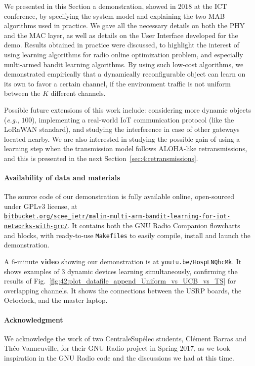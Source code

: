 We presented in this Section a demonstration, showed in $2018$ at the ICT conference,
by specifying the system model and explaining the two MAB algorithms used in practice.
We gave all the necessary details on both the PHY and the MAC layer, as well as details on the User Interface developed for the demo.
Results obtained in practice were discussed, to highlight the interest of using learning algorithms for radio online optimization problem, and especially multi-armed bandit learning algorithms.
%
By using such low-cost algorithms, we demonstrated empirically that a dynamically reconfigurable object can learn on its own to favor a certain channel, if the environment traffic is not uniform between the $K$ different channels.


Possible future extensions of this work include:
considering more dynamic objects (\emph{e.g.}, $100$),
implementing a real-world IoT communication protocol (like the LoRaWAN standard),
and studying the interference in case of other gateways located nearby.
%
We are also interested in studying the possible gain of using a learning step when the transmission model follows ALOHA-like retransmissions, and this is presented in the next Section~\ref{sec:4:retransmissions}.


\paragraph{Availability of data and materials}
%
The source code of our demonstration is fully available online, open-sourced under GPLv3 license, at\\
\href{https://bitbucket.org/scee_ietr/malin-multi-arm-bandit-learning-for-iot-networks-with-grc}{\texttt{bitbucket.org/scee\_ietr/malin-multi-arm-bandit-learning-for-iot-networks-with-grc/}}.
It contains both the GNU Radio Companion flowcharts and blocks, with ready-to-use \texttt{Makefiles} to easily compile, install and launch the demonstration.

A $6$-minute \textbf{video} showing our demonstration is at \texttt{\url{youtu.be/HospLNQhcMk}}.
It shows examples of $3$ dynamic devices learning simultaneously, confirming the results of Fig.~\ref{fig:42:plot_datafile_append_Uniform_vs_UCB_vs_TS} for overlapping channels.
It shows the connections between the USRP boards, the Octoclock, and the master laptop.

\paragraph{Acknowledgment}
%
We acknowledge the work of two CentraleSup{\'e}lec students,
Cl{\'e}ment Barras and Th{\'e}o Vanneuville, for their GNU Radio project in Spring $2017$,
as we took inspiration in the GNU Radio code and the discussions we had at this time.


% 
% 
